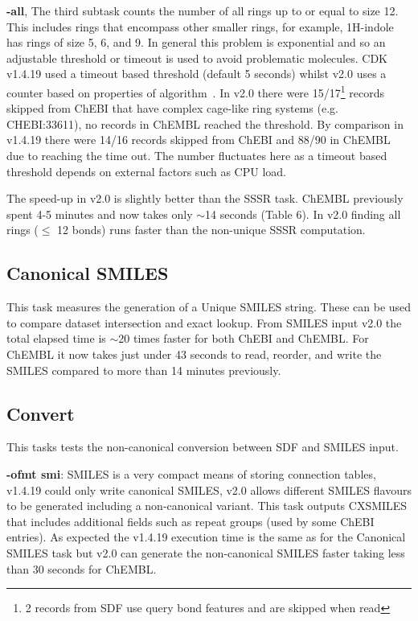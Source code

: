 \documentclass[doublespacing]{bmcart}
\def \cdkversion {v2.0}
\begin{document}
\textbf{-all}, The third subtask counts the number of all rings up to or equal
to size 12. This includes rings that encompass other smaller rings, for 
example, 1H-indole has rings of size 5, 6, and 9. In general this problem is 
exponential and so an adjustable threshold or timeout is used to avoid problematic 
molecules. CDK v1.4.19 used a timeout based threshold (default 5 seconds) 
whilst \cdkversion{} uses a 
counter based on properties of algorithm~\cite{May2014}. In \cdkversion{} there
were 15/17\footnote{2 records from SDF use query bond features and are skipped
when read} records skipped from ChEBI that have complex cage-like ring systems 
(e.g. CHEBI:33611), no records in ChEMBL reached the threshold. By comparison in
v1.4.19 there were 14/16 records skipped from ChEBI and 88/90 in ChEMBL due to
reaching the time out. The number fluctuates here as a timeout based threshold 
depends on external factors such as CPU load.

The speed-up in \cdkversion{} is slightly better than the SSSR task. ChEMBL 
previously spent 4-5 minutes and now takes only $\sim$14 seconds (Table 6).
In \cdkversion{} finding all rings ($\leq$ 12 bonds) runs faster than the 
non-unique SSSR computation.

\subsection*{Canonical SMILES}

This task measures the generation of a Unique SMILES string. These can be
used to compare dataset intersection and exact lookup. From SMILES input
\cdkversion{} the total elapsed time is $\sim$20 times faster for both ChEBI
and ChEMBL. For ChEMBL it now takes just under 43 seconds to read, reorder, 
and write the SMILES compared to more than 14 minutes previously.

\subsection*{Convert}

This tasks tests the non-canonical conversion between SDF and SMILES input.

\textbf{-ofmt smi}: SMILES is a very compact means of storing connection tables, v1.4.19 could 
only write canonical SMILES, \cdkversion{} allows different SMILES flavours 
to be generated including a non-canonical variant. This task outputs
CXSMILES that includes additional fields such as repeat groups (used by some 
ChEBI entries). As
expected the v1.4.19 execution time is the same as for the Canonical SMILES 
task but \cdkversion{} can generate the non-canonical SMILES faster taking less
than 30 seconds for ChEMBL. 
\end{document}
